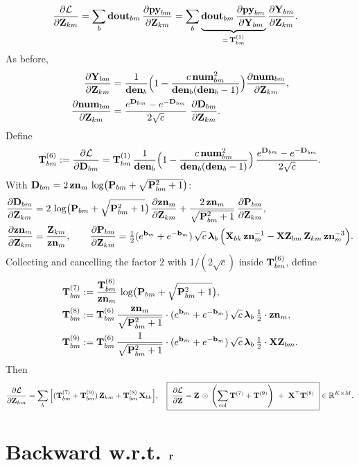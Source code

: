 \documentclass{article}
\begin{document}
\begin{align}
\ddfrac{\mathcal{L}}{\v{Z}{km}}
&= \sum_b \v{dout}{bm}\,\ddfrac{\v{py}{bm}}{\v{Z}{km}}
= \sum_b \underbrace{\v{dout}{bm}\,\ddfrac{\v{py}{bm}}{\v{Y}{bm}}}_{=\,\T{1}{bm}}\ddfrac{\v{Y}{bm}}{\v{Z}{km}}.
\end{align}
As before,
\begin{align}
\ddfrac{\v{Y}{bm}}{\v{Z}{km}}
&= \frac{1}{\v{den}{b}}\Big(1-\frac{c\,\v{num}{bm}^2}{\v{den}{b}(\v{den}{b}-1)}\Big)
\ddfrac{\v{num}{bm}}{\v{Z}{km}},\\
\ddfrac{\v{num}{bm}}{\v{Z}{km}}
&= \frac{\ev{D}{bm}-\ev{-D}{bm}}{2\sqrt{c}}\ \ddfrac{\v{D}{bm}}{\v{Z}{km}}.
\end{align}
Define
\[
\T{6}{bm}:= \ddfrac{\mathcal{L}}{\v{D}{bm}} = \T{1}{bm}\,\frac{1}{\v{den}{b}}\Big(1-\frac{c\,\v{num}{bm}^2}{\v{den}{b}(\v{den}{b}-1)}\Big)\,\frac{\ev{D}{bm}-\ev{-D}{bm}}{2\sqrt{c}}.
\]
With $\v{D}{bm}=2\,\v{zn}{m}\,\log\!\big(\v{P}{bm}+\sqrt{\v{P}{bm}^2+1}\big)$:
\begin{align}
\ddfrac{\v{D}{bm}}{\v{Z}{km}}
&= 2\,\log\!\big(\v{P}{bm}+\sqrt{\v{P}{bm}^2+1}\big)\,\ddfrac{\v{zn}{m}}{\v{Z}{km}}
+ \frac{2\,\v{zn}{m}}{\sqrt{\v{P}{bm}^2+1}}\,\ddfrac{\v{P}{bm}}{\v{Z}{km}},
\\
\ddfrac{\v{zn}{m}}{\v{Z}{km}} &= \frac{\v{Z}{km}}{\v{zn}{m}},\qquad
\ddfrac{\v{P}{bm}}{\v{Z}{km}}
= \tfrac12(\ev{b}{m}+\ev{-b}{m})\,\sqrt{c}\,\lam_b\,
\Big(\v{X}{bk}\,\v{zn}{m}^{-1} - \v{XZ}{bm}\,\v{Z}{km}\,\v{zn}{m}^{-3}\Big).
\end{align}
Collecting and cancelling the factor $2$ with $1/(2\sqrt{c})$ inside $\T{6}{bm}$, define
\begin{align}
\T{7}{bm} &:= \frac{\T{6}{bm}}{\v{zn}{m}}\,\log\!\big(\v{P}{bm}+\sqrt{\v{P}{bm}^2+1}\big),\\
\T{8}{bm} &:= \T{6}{bm}\,\frac{\v{zn}{m}}{\sqrt{\v{P}{bm}^2+1}}
\cdot (\ev{b}{m}+\ev{-b}{m})\,\sqrt{c}\,\lam_b\,\tfrac{1}{2}\cdot \v{zn}{m},\\
\T{9}{bm} &:= \T{6}{bm}\,\frac{1}{\sqrt{\v{P}{bm}^2+1}}
\cdot (\ev{b}{m}+\ev{-b}{m})\,\sqrt{c}\,\lam_b\,\tfrac{1}{2}\cdot \v{XZ}{bm}.
\end{align}
Then
\[
\ddfrac{\mathcal{L}}{\v{Z}{km}}
= \sum_b \Big[(\T{7}{bm}+\T{9}{bm})\,\v{Z}{km} + \T{8}{bm}\,\v{X}{bk}\Big],
\quad
\boxed{\ \ddfrac{\mathcal{L}}{\v{Z}} = \v{Z}\,\odot\,\colnorm{\T{7}+\T{9}}\ +\ \v{X}^\top \T{8}\ }\in\mathbb{R}^{K\times M}.
\]

\section{Backward w.r.t. $\v{r}$}
\end{document}
